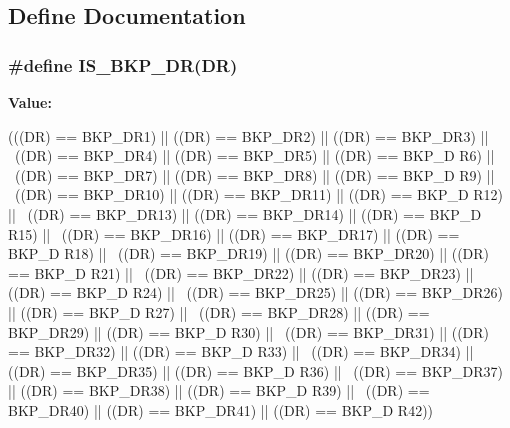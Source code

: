 \subsection{Define Documentation}
\hypertarget{group__Data__Backup__Register_gaff069cf5458ccf0a94e2f784e2d610b8}{
\subsubsection[{IS\_\-BKP\_\-DR}]{\setlength{\rightskip}{0pt plus 5cm}\#define IS\_\-BKP\_\-DR(DR)}}
\label{group__Data__Backup__Register_gaff069cf5458ccf0a94e2f784e2d610b8}
{\bfseries Value:}
\begin{DoxyCode}
(((DR) == BKP_DR1)  || ((DR) == BKP_DR2)  || ((DR) == BKP_DR3)  || \
                       ((DR) == BKP_DR4)  || ((DR) == BKP_DR5)  || ((DR) == BKP_D
      R6)  || \
                       ((DR) == BKP_DR7)  || ((DR) == BKP_DR8)  || ((DR) == BKP_D
      R9)  || \
                       ((DR) == BKP_DR10) || ((DR) == BKP_DR11) || ((DR) == BKP_D
      R12) || \
                       ((DR) == BKP_DR13) || ((DR) == BKP_DR14) || ((DR) == BKP_D
      R15) || \
                       ((DR) == BKP_DR16) || ((DR) == BKP_DR17) || ((DR) == BKP_D
      R18) || \
                       ((DR) == BKP_DR19) || ((DR) == BKP_DR20) || ((DR) == BKP_D
      R21) || \
                       ((DR) == BKP_DR22) || ((DR) == BKP_DR23) || ((DR) == BKP_D
      R24) || \
                       ((DR) == BKP_DR25) || ((DR) == BKP_DR26) || ((DR) == BKP_D
      R27) || \
                       ((DR) == BKP_DR28) || ((DR) == BKP_DR29) || ((DR) == BKP_D
      R30) || \
                       ((DR) == BKP_DR31) || ((DR) == BKP_DR32) || ((DR) == BKP_D
      R33) || \
                       ((DR) == BKP_DR34) || ((DR) == BKP_DR35) || ((DR) == BKP_D
      R36) || \
                       ((DR) == BKP_DR37) || ((DR) == BKP_DR38) || ((DR) == BKP_D
      R39) || \
                       ((DR) == BKP_DR40) || ((DR) == BKP_DR41) || ((DR) == BKP_D
      R42))
\end{DoxyCode}
